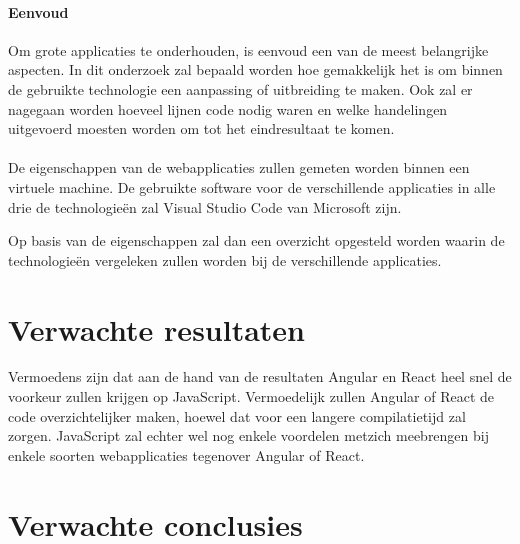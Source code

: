 \paragraph{Eenvoud}
Om grote applicaties te onderhouden, is eenvoud een van de meest belangrijke aspecten. In dit onderzoek zal bepaald worden hoe gemakkelijk het is om binnen de gebruikte technologie een aanpassing of uitbreiding te maken. Ook zal er nagegaan worden hoeveel lijnen code nodig waren en welke handelingen uitgevoerd moesten worden om tot het eindresultaat te komen.
\paragraph{}
De eigenschappen van de webapplicaties zullen gemeten worden binnen een virtuele machine. De gebruikte software voor de verschillende applicaties in alle drie de technologieën zal Visual Studio Code van Microsoft zijn.

Op basis van de eigenschappen zal dan een overzicht opgesteld worden waarin de technologieën vergeleken zullen worden bij de verschillende applicaties.

\section{Verwachte resultaten}
\label{sec:verwachte_resultaten}

Vermoedens zijn dat aan de hand van de resultaten Angular en React heel snel de voorkeur zullen krijgen op JavaScript. Vermoedelijk zullen Angular of React de code overzichtelijker maken, hoewel dat voor een langere compilatietijd zal zorgen. JavaScript zal echter wel nog enkele voordelen metzich meebrengen bij enkele soorten webapplicaties tegenover Angular of React.

\section{Verwachte conclusies}
\label{sec:verwachte_conclusies}


